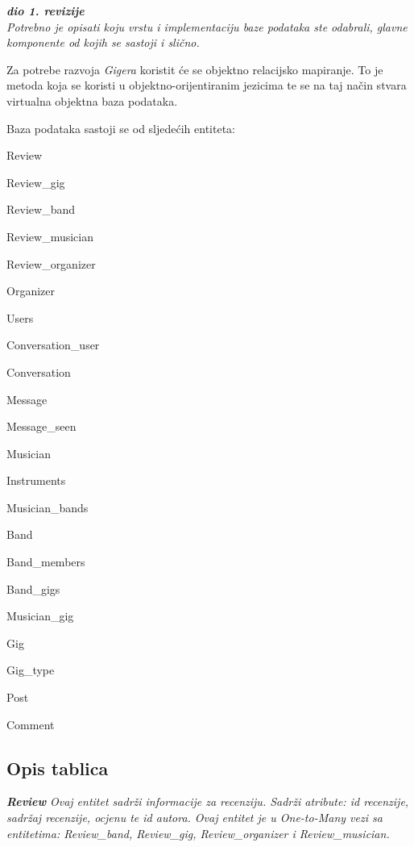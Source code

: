			\textbf{\textit{dio 1. revizije}}\\
			
		\textit{Potrebno je opisati koju vrstu i implementaciju baze podataka ste odabrali, glavne komponente od kojih se sastoji i slično.}
		
		Za potrebe razvoja \textit{Gigera} koristit će se objektno relacijsko mapiranje. To je metoda koja se koristi u objektno-orijentiranim jezicima te se na taj način stvara virtualna objektna baza podataka.
		
		Baza podataka sastoji se od sljedećih entiteta:
		
		\begin{packed_item}
			\item Review
			\item Review\_gig
			\item Review\_band
			\item Review\_musician
			\item Review\_organizer
			\item Organizer
			\item Users
			\item Conversation\_user
			\item Conversation
			\item Message
			\item Message\_seen
			\item Musician
			\item Instruments
			\item Musician\_bands
			\item Band
			\item Band\_members
			\item Band\_gigs
			\item Musician\_gig
			\item Gig
			\item Gig\_type
			\item Post
			\item Comment
		\end{packed_item}
			
		
		
		\subsection{Opis tablica}
		

							\textit{\bf Review}
			\textit{Ovaj entitet sadrži informacije za recenziju. Sadrži atribute: id recenzije, sadržaj recenzije, ocjenu te id autora. Ovaj entitet je u \emph{One-to-Many} vezi  sa entitetima: Review\_band, Review\_gig, Review\_organizer i Review\_musician.}
			

